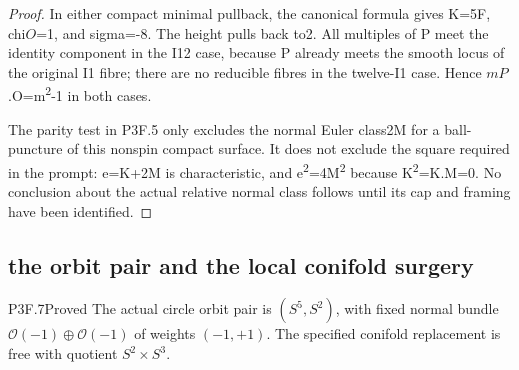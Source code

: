 \begin{proof}
In either compact minimal pullback, the canonical formula gives K=5F, chi\(O\)=1, and sigma=-8. The height pulls back to2. All multiples of P meet the identity component in the I12 case, because P already meets the smooth locus of the original I1 fibre; there are no reducible fibres in the twelve-I1 case. Hence \(mP\).O=m\textsuperscript{2}-1 in both cases.

The parity test in P3F.5 only excludes the normal Euler class2M for a ball-puncture of this nonspin compact surface. It does not exclude the square required in the prompt: e=K+2M is characteristic, and e\textsuperscript{2}=4M\textsuperscript{2} because K\textsuperscript{2}=K.M=0. No conclusion about the actual relative normal class follows until its cap and framing have been identified.
\end{proof}
\subsection{the orbit pair and the local conifold surgery}
\begin{statement}{P3F.7}{Proved}
The actual circle orbit pair is $(S^5,S^2)$, with fixed normal bundle $\mathcal O(-1)\oplus\mathcal O(-1)$ of weights $(-1,+1)$. The specified conifold replacement is free with quotient $S^2\times S^3$.
\end{statement}
